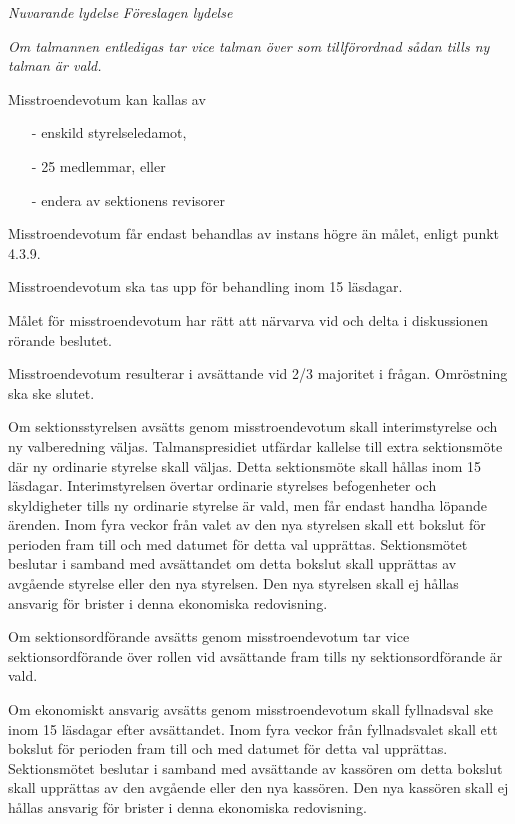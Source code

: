 \documentclass{article}
\newenvironment{lydelse}
    {\begin{paracol}{2}%
        \emph{Nuvarande lydelse}%
        \switchcolumn%
        \emph{Föreslagen lydelse}%
    \end{paracol}%
    \begin{enumerate}[label=\thesubsection.\arabic*]%
    \begin{paracol}{2}%
    }{\end{paracol}\end{enumerate}}
\begin{document}
\begin{lydelse}
    \item \emph{Om talmannen entledigas tar vice talman över som tillförordnad sådan tills ny talman är vald.}
     

  \switchcolumn*
    \setcounter{subsection}{3}
    \item Misstroendevotum kan kallas av
	  \begin{itemize}
		\item[-] enskild styrelseledamot, 
  		\item[-] 25 medlemmar, eller
  		\item[-] endera av sektionens revisorer
  	  \end{itemize}
	
	\item Misstroendevotum får endast behandlas av instans högre än målet, enligt punkt 4.3.9.

  	\item Misstroendevotum ska tas upp för behandling inom 15 läsdagar.

  	\item Målet för misstroendevotum har rätt att närvarva vid och delta i diskussionen rörande beslutet.

  	\item Misstroendevotum resulterar i avsättande vid 2/3 majoritet i frågan. Omröstning ska ske slutet. 

  	\item Om sektionsstyrelsen avsätts genom misstroendevotum skall interimstyrelse och ny valberedning väljas. Talmanspresidiet utfärdar kallelse till extra sektionsmöte där ny ordinarie styrelse skall väljas. Detta sektionsmöte skall hållas inom 15 läsdagar. Interimstyrelsen övertar ordinarie styrelses befogenheter och skyldigheter tills ny ordinarie styrelse är vald, men får endast handha löpande ärenden. Inom fyra veckor från valet av den nya styrelsen skall ett bokslut för perioden fram till och med datumet för detta val upprättas. Sektionsmötet beslutar i samband med avsättandet om detta bokslut skall upprättas av avgående styrelse eller den nya styrelsen. Den nya styrelsen skall ej hållas ansvarig för brister i denna ekonomiska redovisning.

  	\item Om sektionsordförande avsätts genom misstroendevotum tar vice sektionsordförande över rollen vid avsättande fram tills ny sektionsordförande är vald.

  	\item Om ekonomiskt ansvarig avsätts genom misstroendevotum skall fyllnadsval ske inom 15 läsdagar efter avsättandet. Inom fyra veckor från fyllnadsvalet skall ett bokslut för perioden fram till och med datumet för detta val upprättas. Sektionsmötet beslutar i samband med avsättande av kassören om detta bokslut skall upprättas av den avgående eller den nya kassören. Den nya kassören skall ej hållas  ansvarig för brister i denna ekonomiska redovisning. 


\end{lydelse}
\end{document}
